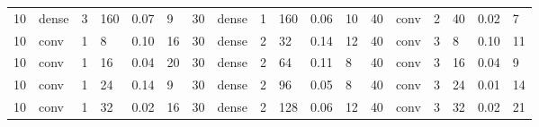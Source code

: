 \begin{table}
{\begin{tabular}{@{}llllll|llllll|llllll@{}}
10                              & dense                          & 3                              & 160                            & 0.07                             & 9                                 & 30                              & dense                          & 1                              & 160                            & 0.06                           & 10                                & 40                              & conv                           & 2                              & 40                             & 0.02                           & 7                                \\
10                              & conv                           & 1                              & 8                              & 0.10                             & 16                                & 30                              & dense                          & 2                              & 32                             & 0.14                           & 12                                & 40                              & conv                           & 3                              & 8                              & 0.10                           & 11                               \\
10                              & conv                           & 1                              & 16                             & 0.04                             & 20                                & 30                              & dense                          & 2                              & 64                             & 0.11                           & 8                                 & 40                              & conv                           & 3                              & 16                             & 0.04                           & 9                                \\
10                              & conv                           & 1                              & 24                             & 0.14                             & 9                                 & 30                              & dense                          & 2                              & 96                             & 0.05                           & 8                                 & 40                              & conv                           & 3                              & 24                             & 0.01                           & 14                               \\
10                              & conv                           & 1                              & 32                             & 0.02                             & 16                                & 30                              & dense                          & 2                              & 128                            & 0.06                           & 12                                & 40                              & conv                           & 3                              & 32                             & 0.02                           & 21                               \\

\end{tabular}}
\end{table}
